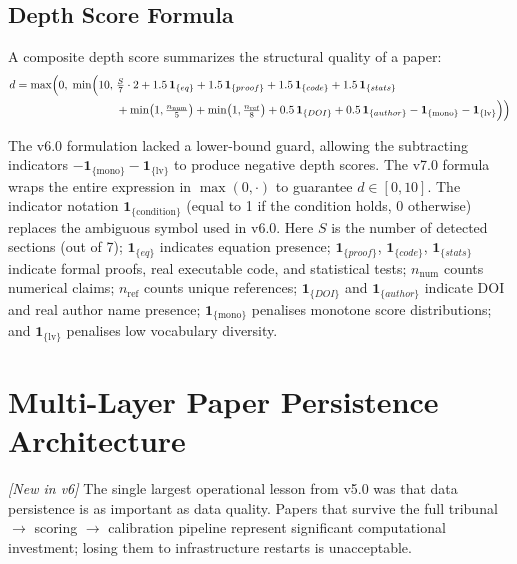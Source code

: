 \documentclass[11pt,a4paper]{article}
\theoremstyle{plain}
\theoremstyle{definition}
\theoremstyle{remark}
\newcommand{\indicator}[1]{\mathbf{1}_{\{#1\}}}
\newcommand{\indicatorlv}{\mathbf{1}_{\{\mathrm{lv}\}}}
\newcommand{\indicatormono}{\mathbf{1}_{\{\mathrm{mono}\}}}
\begin{document}
\subsection{Depth Score Formula}

A composite depth score summarizes the structural quality of a paper:
\begin{equation}
\begin{aligned}
  d = \max\Bigl(0,\;\min\Bigl(10,\;
      &\tfrac{S}{7}\cdot 2
      + 1.5\,\indicator{eq}
      + 1.5\,\indicator{proof}
      + 1.5\,\indicator{code}
      + 1.5\,\indicator{stats}\\
      &+ \min\bigl(1,\tfrac{n_{\text{num}}}{5}\bigr)
      + \min\bigl(1,\tfrac{n_{\text{ref}}}{8}\bigr)
      + 0.5\,\indicator{DOI}
      + 0.5\,\indicator{author}
      - \indicatormono
      - \indicatorlv
      \Bigr)\Bigr)
\end{aligned}
  \label{eq:depth}
\end{equation}

\begin{correction}
The v6.0 formulation lacked a lower-bound guard, allowing the subtracting indicators
$-\indicatormono - \indicatorlv$ to produce negative depth scores.  The v7.0
formula wraps the entire expression in $\max(0,\cdot)$ to guarantee $d \in [0,10]$.
The indicator notation $\indicator{\text{condition}}$ (equal to 1 if the condition holds,
0 otherwise) replaces the ambiguous symbol used in v6.0.
Here $S$ is the number of detected sections (out of 7); $\indicator{eq}$ indicates equation
presence; $\indicator{proof}$, $\indicator{code}$, $\indicator{stats}$ indicate formal proofs,
real executable code, and statistical tests; $n_{\text{num}}$ counts numerical claims;
$n_{\text{ref}}$ counts unique references; $\indicator{DOI}$ and $\indicator{author}$ indicate
DOI and real author name presence; $\indicatormono$ penalises monotone score distributions;
and $\indicatorlv$ penalises low vocabulary diversity.
\end{correction}

\section{Multi-Layer Paper Persistence Architecture}
\label{sec:persistence}

\emph{[New in v6]} The single largest operational lesson from v5.0 was that data persistence is
as important as data quality.  Papers that survive the full tribunal $\to$ scoring $\to$
calibration pipeline represent significant computational investment; losing them to infrastructure
restarts is unacceptable.
\end{document}
